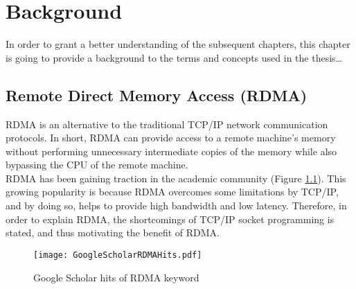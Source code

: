 \chapter{Background}
\label{chap:background}
In order to grant a better understanding of the subsequent chapters, this chapter is going to provide a background to the terms and concepts used in the thesis\dots

\section{Remote Direct Memory Access (RDMA)}
\label{sec:RDMA}
\ac{RDMA} is an alternative to the traditional \ac{TCP/IP} network communication protocols. In short, \ac{RDMA} can provide access to a remote machine's memory without performing unnecessary intermediate copies of the memory while also bypassing the CPU of the remote machine.\\
RDMA has been gaining traction in the academic community (Figure \ref{fig:rdmaHits}). This growing popularity is because \ac{RDMA} overcomes some limitations by \ac{TCP/IP}, and by doing so, helps to provide high bandwidth and low latency.
Therefore, in order to explain \ac{RDMA}, the shortcomings of \ac{TCP/IP} socket programming is stated, and thus motivating the benefit of \ac{RDMA}.

\begin{figure}[h]
  \centering
  \texttt{[image: GoogleScholarRDMAHits.pdf]}
  \caption{Google Scholar hits of RDMA keyword}
  \label{fig:rdmaHits}
\end{figure}